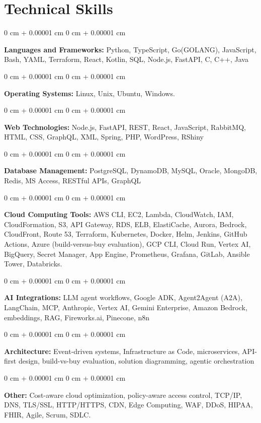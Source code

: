 \documentclass[10pt, letterpaper]{article}
\newenvironment{onecolentry}{
    \begin{adjustwidth}{
        0 cm + 0.00001 cm
    }{
        0 cm + 0.00001 cm
    }
}{
    \end{adjustwidth}
} %
\begin{document}
    \vspace{2 pt }

    \section{Technical Skills}
    \vspace{2 pt }
    \begin{onecolentry}
    \textbf{Languages and Frameworks:} Python, TypeScript, Go(GOLANG), JavaScript, Bash, YAML, Terraform, React, Kotlin, SQL, Node.js, FastAPI, C, C++, Java
    \end{onecolentry}
    \begin{onecolentry}
        \textbf{Operating Systems:} Linux, Unix, Ubuntu, Windows.
    \end{onecolentry}
    \begin{onecolentry}
         \textbf{Web Technologies:} Node.js, FastAPI, REST, React, JavaScript, RabbitMQ, HTML, CSS, GraphQL, XML, Spring, PHP, WordPress, RShiny
    \end{onecolentry}
    \begin{onecolentry}
        \textbf{Database Management:} PostgreSQL, DynamoDB, MySQL, Oracle, MongoDB, Redis, MS Access, RESTful APIs, GraphQL
    \end{onecolentry}
    \begin{onecolentry}
        \textbf{Cloud Computing Tools:}
AWS CLI, EC2, Lambda, CloudWatch, IAM, CloudFormation, S3, API Gateway, RDS, ELB, ElastiCache, Aurora, Bedrock, CloudFront, Route 53, Terraform, Kubernetes, Docker, Helm, Jenkins, GitHub Actions, Azure (build-versus-buy evaluation), GCP CLI, Cloud Run, Vertex AI, BigQuery, Secret Manager, App Engine, Prometheus, Grafana, GitLab, Ansible Tower, Databricks.
    \end{onecolentry}
    \begin{onecolentry}
         \textbf{AI Integrations:} LLM agent workflows, Google ADK, Agent2Agent (A2A), LangChain, MCP, Anthropic, Vertex AI, Gemini Enterprise, Amazon Bedrock, embeddings, RAG, Fireworks.ai, Pinecone, n8n
    \end{onecolentry}
    \begin{onecolentry}
        \textbf{Architecture:} Event-driven systems, Infrastructure as Code, microservices, API-first design, build-vs-buy evaluation, solution diagramming, agentic orchestration
    \end{onecolentry}
        \begin{onecolentry}
     \textbf{Other:} Cost-aware cloud optimization, policy-aware access control, TCP/IP, DNS, TLS/SSL, HTTP/HTTPS, CDN, Edge Computing, WAF, DDoS, HIPAA, FHIR, Agile, Scrum, SDLC.
    \end{onecolentry}
\end{document}
